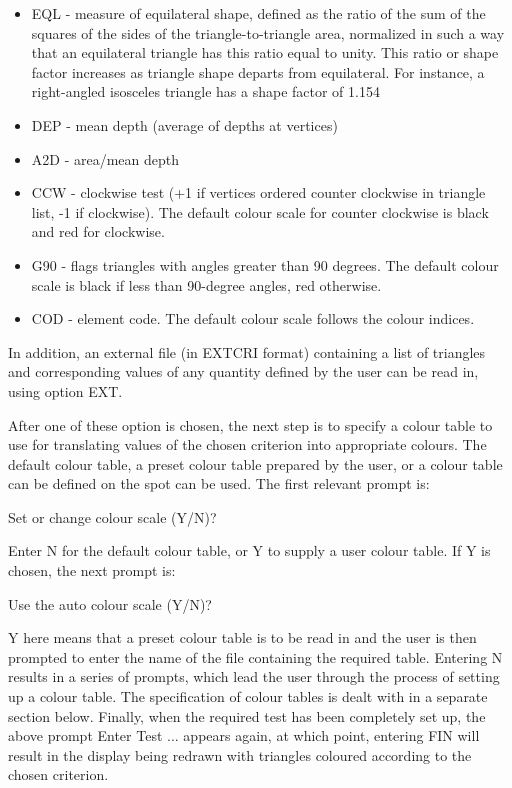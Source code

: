 \documentclass{article}
\begin{document}
\begin{itemize}
\item EQL - measure of equilateral shape, defined as the ratio of the sum of the squares of the sides of the triangle-to-triangle area, normalized in such a way that an equilateral triangle has this ratio equal to unity. This ratio or shape factor increases as triangle shape departs from equilateral. For instance, a right-angled isosceles triangle has a shape factor of 1.154
\item DEP - mean depth (average of depths at vertices)
\item A2D - area/mean depth
\item CCW - clockwise test (+1 if vertices ordered counter clockwise in triangle list, -1 if clockwise). The default colour scale for counter clockwise is black and red for clockwise.
\item G90 - flags triangles with angles greater than 90 degrees. The default colour scale is black if less than 90-degree angles, red otherwise.
\item COD - element code. The default colour scale follows the colour indices.
\end{itemize}
In addition, an external file (in EXTCRI format) containing a list of triangles and corresponding values of any quantity defined by the user can be read in, using option EXT.

After one of these option is chosen, the next step is to specify a colour table to use for translating values of the chosen criterion into appropriate colours. The default colour table, a preset colour table prepared by the user, or a colour table can be defined on the spot can be used. The first relevant prompt is:

Set or change colour scale (Y/N)?

Enter N for the default colour table, or Y to supply a user colour table. If Y is chosen, the next prompt is:

Use the auto colour scale (Y/N)?

Y here means that a preset colour table is to be read in and the user is then prompted to enter the name of the file containing the required table. Entering N results in a series of prompts, which lead the user through the process of setting up a colour table. The specification of colour tables is dealt with in a separate section below. Finally, when the required test has been completely set up, the above prompt {\textquotedbl}Enter Test ... {\textquotedbl} appears again, at which point, entering FIN will result in the display being redrawn with triangles coloured according to the chosen criterion.
\end{document}
